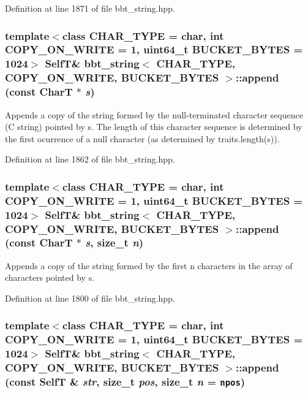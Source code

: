 Definition at line 1871 of file bbt\_\-string.hpp.\hypertarget{classbbt__string_a5c997633467454dc7f88198d818a564}{
\subsubsection[{append}]{\setlength{\rightskip}{0pt plus 5cm}template$<$class CHAR\_\-TYPE  = char, int COPY\_\-ON\_\-WRITE = 1, uint64\_\-t BUCKET\_\-BYTES = 1024$>$ {\bf SelfT}\& {\bf bbt\_\-string}$<$ CHAR\_\-TYPE, COPY\_\-ON\_\-WRITE, BUCKET\_\-BYTES $>$::append (const CharT $\ast$ {\em s})}}
\label{classbbt__string_a5c997633467454dc7f88198d818a564}


Appends a copy of the string formed by the null-terminated character sequence (C string) pointed by s. The length of this character sequence is determined by the first ocurrence of a null character (as determined by traits.length(s)). 

Definition at line 1862 of file bbt\_\-string.hpp.\hypertarget{classbbt__string_6386d346b67e828d43b66f44037a66b3}{
\subsubsection[{append}]{\setlength{\rightskip}{0pt plus 5cm}template$<$class CHAR\_\-TYPE  = char, int COPY\_\-ON\_\-WRITE = 1, uint64\_\-t BUCKET\_\-BYTES = 1024$>$ {\bf SelfT}\& {\bf bbt\_\-string}$<$ CHAR\_\-TYPE, COPY\_\-ON\_\-WRITE, BUCKET\_\-BYTES $>$::append (const CharT $\ast$ {\em s}, \/  size\_\-t {\em n})}}
\label{classbbt__string_6386d346b67e828d43b66f44037a66b3}


Appends a copy of the string formed by the first n characters in the array of characters pointed by s. 

Definition at line 1800 of file bbt\_\-string.hpp.\hypertarget{classbbt__string_9f1e0deb4ea27ec60dc578bb4d3cb7b8}{
\subsubsection[{append}]{\setlength{\rightskip}{0pt plus 5cm}template$<$class CHAR\_\-TYPE  = char, int COPY\_\-ON\_\-WRITE = 1, uint64\_\-t BUCKET\_\-BYTES = 1024$>$ {\bf SelfT}\& {\bf bbt\_\-string}$<$ CHAR\_\-TYPE, COPY\_\-ON\_\-WRITE, BUCKET\_\-BYTES $>$::append (const {\bf SelfT} \& {\em str}, \/  size\_\-t {\em pos}, \/  size\_\-t {\em n} = {\tt npos})}}
\label{classbbt__string_9f1e0deb4ea27ec60dc578bb4d3cb7b8}


